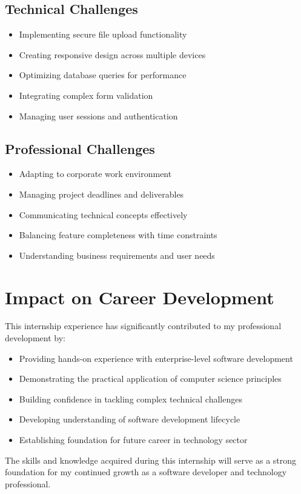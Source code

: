\subsection{Technical Challenges}
\begin{itemize}
    \item Implementing secure file upload functionality
    \item Creating responsive design across multiple devices
    \item Optimizing database queries for performance
    \item Integrating complex form validation
    \item Managing user sessions and authentication
\end{itemize}

\subsection{Professional Challenges}
\begin{itemize}
    \item Adapting to corporate work environment
    \item Managing project deadlines and deliverables
    \item Communicating technical concepts effectively
    \item Balancing feature completeness with time constraints
    \item Understanding business requirements and user needs
\end{itemize}

\section{Impact on Career Development}

This internship experience has significantly contributed to my professional development by:

\begin{itemize}
    \item Providing hands-on experience with enterprise-level software development
    \item Demonstrating the practical application of computer science principles
    \item Building confidence in tackling complex technical challenges
    \item Developing understanding of software development lifecycle
    \item Establishing foundation for future career in technology sector
\end{itemize}

The skills and knowledge acquired during this internship will serve as a strong foundation for my continued growth as a software developer and technology professional.
